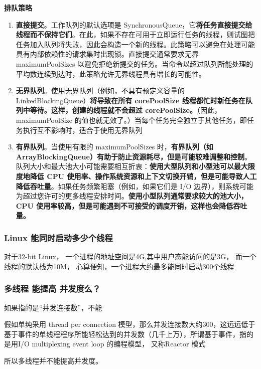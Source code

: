 \documentclass[UTF8,a4paper,8pt]{ctexart}
\begin{document}
			\textbf{排队策略}
				\begin{enumerate}
					\item \textbf{直接提交}。工作队列的默认选项是 SynchronousQueue，它\textbf{将任务直接提交给线程而不保持它们}。在此，如果不存在可用于立即运行任务的线程，则试图把任务加入队列将失败，因此会构造一个新的线程。此策略可以避免在处理可能具有内部依赖性的请求集时出现锁。直接提交通常要求无界 maximumPoolSizes 以避免拒绝新提交的任务。当命令以超过队列所能处理的平均数连续到达时，此策略允许无界线程具有增长的可能性。 
					
					\item \textbf{无界队列}。使用无界队列（例如，不具有预定义容量的 LinkedBlockingQueue）\textbf{将导致在所有 corePoolSize 线程都忙时新任务在队列中等待。这样，创建的线程就不会超过 corePoolSize。}（因此，maximumPoolSize 的值也就无效了。）当每个任务完全独立于其他任务，即任务执行互不影响时，适合于使用无界队列 
					
					\item  \textbf{有界队列}。当使用有限的 maximumPoolSizes 时，\textbf{有界队列（如 ArrayBlockingQueue）有助于防止资源耗尽，但是可能较难调整和控制}。队列大小和最大池大小可能需要相互折衷：\textbf{使用大型队列和小型池可以最大限度地降低 CPU 使用率、操作系统资源和上下文切换开销，但是可能导致人工降低吞吐量}。如果任务频繁阻塞（例如，如果它们是 I/O 边界），则系统可能为超过您许可的更多线程安排时间。\textbf{使用小型队列通常要求较大的池大小，CPU 使用率较高，但是可能遇到不可接受的调度开销，这样也会降低吞吐量。}
				\end{enumerate}
				
		\subsubsection{Linux  能同时启动多少个线程}
			对于32-bit Linux， 一个进程的地址空间是4G,其中用户态能访问的是3G， 而一个线程的默认栈为10M， 心算便知，一个进程大约最多能同时启动300个线程	
		
		\subsubsection{多线程 能提高 并发度么？}
			如果指的是“并发连接数”，不能
			
			假如单纯采用 thread per connection 模型，那么并发连接数大约300，这远远低于基于事件的单线程程序所能轻松达到的并发数（几千上万），所谓基于事件，指的是用I/O multiplexing event loop 的编程模型， 又称Reactor 模式
			
			所以多线程并不能提高并发度。
 		
\end{document}
